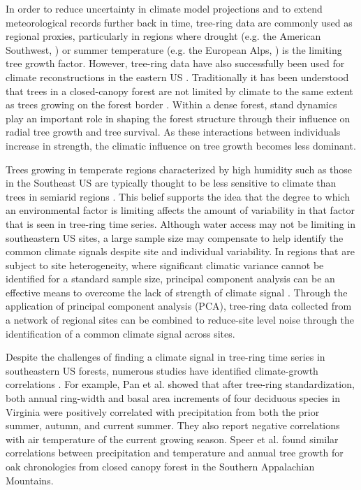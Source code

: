 In order to reduce uncertainty in climate model projections and to extend meteorological records further back in time, tree-ring data are commonly used as regional proxies, particularly in regions where drought (e.g. the American Southwest, \cite{cook2004long}) or summer temperature (e.g. the European Alps, \cite{buntgen2007growth}) is the limiting tree growth factor. However, tree-ring data have also successfully been used for climate reconstructions in the eastern US \cite{leblanc1993temporal, stahle1993, cook1999drought}. Traditionally it has been understood that trees in a closed-canopy forest are not limited by climate to the same extent as trees growing on the forest border \cite{fritts1976tree}. Within a dense forest, stand dynamics play an important role in shaping the forest structure through their influence on radial tree growth and tree survival. As these interactions between individuals increase in strength, the climatic influence on tree growth becomes less dominant. 

Trees growing in temperate regions characterized by high humidity such as those in the Southeast US are typically thought to be less sensitive to climate than trees in semiarid regions \cite{phipps1982comments}. This belief supports the idea that the degree to which an environmental factor is limiting affects the amount of variability in that factor that is seen in tree-ring time series. Although water access may not be limiting in southeastern US sites, a large sample size may compensate to help identify the common climate signals despite site and individual variability. In regions that are subject to site heterogeneity, where significant climatic variance cannot be identified for a standard sample size, principal component analysis can be an effective means to overcome the lack of strength of climate signal \cite{peters1981principal, anchukaitis2006forward, jacoby1989reconstructed}. Through the application of principal component analysis (PCA)\label{sym:PCA}, tree-ring data collected from a network of regional sites can be combined to reduce-site level noise through the identification of a common climate signal across sites.

Despite the challenges of finding a climate signal in tree-ring time series in southeastern US forests, numerous studies have identified climate-growth correlations \cite{pan1997dendroclimatological, speer2009climate, rubino2000dendroclimatological}. For example, Pan et al. \citet{pan1997dendroclimatological} showed that after tree-ring standardization, both annual ring-width and basal area increments of four deciduous species in Virginia were positively correlated with precipitation from both the prior summer, autumn, and current summer. They also report negative correlations with air temperature of the current growing season. Speer et al. \citet{speer2009climate} found similar correlations between precipitation and temperature and annual tree growth for oak chronologies from closed canopy forest in the Southern Appalachian Mountains. 

